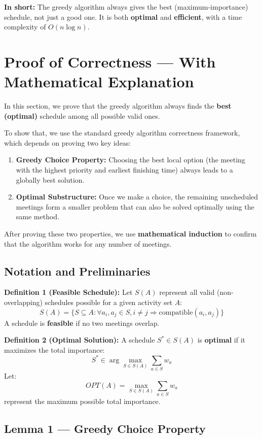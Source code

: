\documentclass[conference]{IEEEtran}
\begin{document}
\textbf{In short:}  
The greedy algorithm always gives the best (maximum-importance) schedule, not just a good one.  
It is both \textbf{optimal} and \textbf{efficient}, with a time complexity of $O(n \log n)$.

\section{Proof of Correctness — With Mathematical Explanation}

In this section, we prove that the greedy algorithm always finds the \textbf{best (optimal)} schedule among all possible valid ones.

To show that, we use the standard greedy algorithm correctness framework, which depends on proving two key ideas:

\begin{enumerate}
    \item \textbf{Greedy Choice Property:} Choosing the best local option (the meeting with the highest priority and earliest finishing time) always leads to a globally best solution.
    \item \textbf{Optimal Substructure:} Once we make a choice, the remaining unscheduled meetings form a smaller problem that can also be solved optimally using the same method.
\end{enumerate}

After proving these two properties, we use \textbf{mathematical induction} to confirm that the algorithm works for any number of meetings.

\subsection{Notation and Preliminaries}

\textbf{Definition 1 (Feasible Schedule):}
Let \( S(A) \) represent all valid (non-overlapping) schedules possible for a given activity set \( A \):
\[
S(A) = \{ S \subseteq A : \forall a_i, a_j \in S, i \neq j \Rightarrow \text{compatible}(a_i, a_j) \}
\]
A schedule is \textbf{feasible} if no two meetings overlap.

\medskip
\textbf{Definition 2 (Optimal Solution):}
A schedule \( S^* \in S(A) \) is \textbf{optimal} if it maximizes the total importance:
\[
S^* \in \arg\max_{S \in S(A)} \sum_{a \in S} w_a
\]
Let:
\[
OPT(A) = \max_{S \in S(A)} \sum_{a \in S} w_a
\]
represent the maximum possible total importance.

\subsection{Lemma 1 — Greedy Choice Property}
\end{document}
